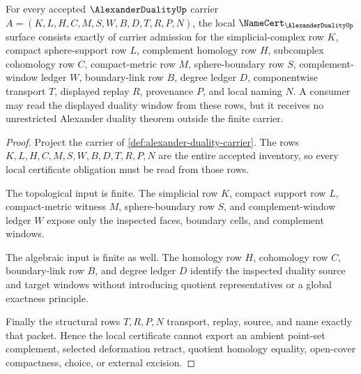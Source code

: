 \begin{theorem}
\label{thm:alexander-duality-namecert-obligations}
For every accepted $\AlexanderDualityUp$ carrier $A=(K,L,H,C,M,S,W,B,D,T,R,P,N)$, the local $\NameCert_{\AlexanderDualityUp}$ surface consists exactly of carrier admission for the simplicial-complex row $K$, compact sphere-support row $L$, complement homology row $H$, subcomplex cohomology row $C$, compact-metric row $M$, sphere-boundary row $S$, complement-window ledger $W$, boundary-link row $B$, degree ledger $D$, componentwise transport $T$, displayed replay $R$, provenance $P$, and local naming $N$. A consumer may read the displayed duality window from these rows, but it receives no unrestricted Alexander duality theorem outside the finite carrier.
\end{theorem}
\begin{proof}
Project the carrier of \autoref{def:alexander-duality-carrier}. The rows $K,L,H,C,M,S,W,B,D,T,R,P,N$ are the entire accepted inventory, so every local certificate obligation must be read from those rows.

The topological input is finite. The simplicial row $K$, compact support row $L$, compact-metric witness $M$, sphere-boundary row $S$, and complement-window ledger $W$ expose only the inspected faces, boundary cells, and complement windows.

The algebraic input is finite as well. The homology row $H$, cohomology row $C$, boundary-link row $B$, and degree ledger $D$ identify the inspected duality source and target windows without introducing quotient representatives or a global exactness principle.

Finally the structural rows $T,R,P,N$ transport, replay, source, and name exactly that packet. Hence the local certificate cannot export an ambient point-set complement, selected deformation retract, quotient homology equality, open-cover compactness, choice, or external excision.
\end{proof}

